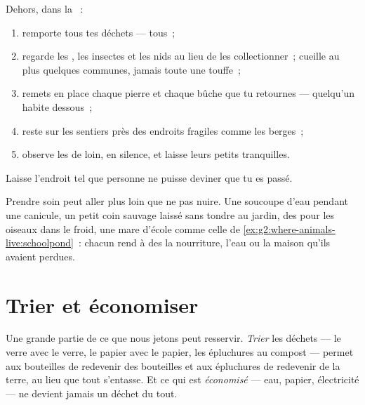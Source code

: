 \begin{method}\label{met:g2:caring-for-nature:rules}
Dehors, dans la ~:
\begin{enumerate}
  \item remporte tous tes déchets --- tous~;
  \item regarde les , les insectes et les nids au lieu de les
        collectionner~; cueille au plus quelques  communes,
        jamais toute une touffe~;
  \item remets en place chaque pierre et chaque bûche que tu
        retournes --- quelqu'un habite dessous~;
  \item reste sur les sentiers près des endroits fragiles comme les
        berges~;
  \item observe les  de loin, en silence, et laisse leurs
        petits tranquilles.
\end{enumerate}
Laisse l'endroit tel que personne ne puisse deviner que tu es passé.
\end{method}

\begin{example}\label{ex:g2:caring-for-nature:help}
Prendre soin peut aller plus loin que ne pas nuire. Une soucoupe
d'eau pendant une canicule, un petit coin sauvage laissé sans
tondre au jardin, des  pour les oiseaux dans le froid, une
mare d'école comme celle de
\cref{ex:g2:where-animals-live:schoolpond}~: chacun rend à des  la nourriture, l'eau ou la maison qu'ils avaient perdues.
\end{example}

\section{Trier et économiser}

\begin{proposition}\label{prop:g2:caring-for-nature:recycle}
Une grande partie de ce que nous jetons peut resservir.
\emph{Trier} les déchets --- le verre avec le
verre, le papier avec le papier, les épluchures au compost --- permet
aux bouteilles de redevenir des bouteilles et aux épluchures de
redevenir de la terre, au lieu que tout s'entasse. Et ce qui est
\emph{économisé} --- eau, papier, électricité --- ne devient jamais
un déchet du tout.
\end{proposition}
\admitted

